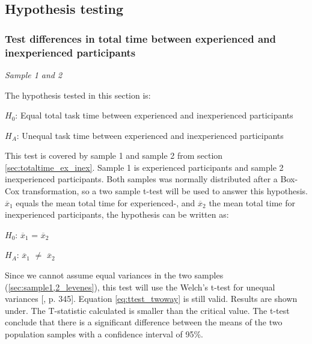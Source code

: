 \subsection{Hypothesis testing}\label{sec:hypothesis_results}

\subsubsection[Sample 1, 2]{Test differences in total time between experienced and inexperienced participants}\label{sec:t-test_result} %

\textit{Sample 1 and 2}\newline

The hypothesis tested in this section is: \\[0.3cm]

\centerline{$H_{0}$: Equal total task time between experienced and inexperienced participants} 
\centerline{$H_{A}$: Unequal task time between experienced and inexperienced participants}

\vspace{0.3cm}

This test is covered by sample 1 and sample 2 from section \ref{sec:totaltime_ex_inex}. Sample 1 is experienced participants and sample 2 inexperienced participants. Both samples was normally distributed after a Box-Cox transformation, so a two sample t-test will be used to answer this hypothesis. $\overline{x}_1$ equals the mean total time for experienced-, and $\overline{x}_2$ the mean total time for inexperienced participants, the hypothesis can be written as:\\[0.3cm]

\centerline{$H_{0}$: $\overline{x}_1$ = $\overline{x}_2$} 
\centerline{$H_{A}$: $\overline{x}_1$ $\neq$ $\overline{x}_2$}

\vspace{0.3cm}

Since we cannot assume equal variances in the two samples (\ref{sec:sample1,2_levenes}), this test will use the Welch's t-test for unequal variances [\citep{Walpole2012}, p. 345]. Equation \ref{eq:ttest_twoway} is still valid. Results are shown under. The T-statistic calculated is smaller than the critical value. The t-test conclude that there is a significant difference between the means of the two population samples with a confidence interval of 95\%.\\[0.2cm]

